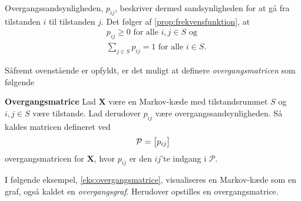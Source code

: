 Overgangssandsynligheden, $p_{ij}$, beskriver dermed sandsynligheden for at gå fra tilstanden $i$ til tilstanden $j$. Det følger af \autoref{prop:frekvensfunktion}, at
%
\begin{align*}
    &p_{ij}\geq 0 \text{ for alle } i,j\in S \text{ og}\\
    &\sum_{j\in S} p_{ij}=1 \text{ for alle } i\in S.
\end{align*}


Såfremt ovenstående er opfyldt, er det muligt at definere \textit{overgangsmatricen} som følgende

\begin{minipage}\textwidth
\begin{defn}\textbf{Overgangsmatrice}\label{def:ovegangsmatrice} %
\newline
Lad $\bm X$ være en Markov-kæde med tilstandsrummet $S$ og $i,j \in S$ være tilstande. Lad derudover $p_{ij}$ være overgangssandsynligheden. Så kaldes matricen defineret ved
\begin{align*}
    \P = \left[p_{ij}\right]
\end{align*}
overgangsmatricen for $\bm X$, hvor $p_{ij}$ er den $ij$'te indgang i $\mathcal{P}$.
\end{defn}
\end{minipage}

I følgende eksempel, \autoref{eks:overgangsmatrice}, visualiseres en Markov-kæde som en graf, også kaldet en \textit{overgangsgraf}. Herudover opstilles en overgangsmatrice.

